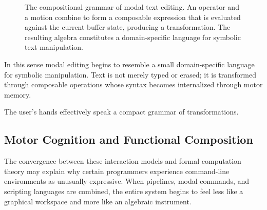 \documentclass[11pt]{article}
\theoremstyle{definition}
\begin{document}
\begin{figure}[h]
\centering
{}
\caption{The compositional grammar of modal text editing. An operator
and a motion combine to form a composable expression that is evaluated
against the current buffer state, producing a transformation. The
resulting algebra constitutes a domain-specific language for symbolic
text manipulation.}
\label{fig:modal_grammar}
\end{figure}

In this sense modal editing begins to resemble a small domain-specific
language for symbolic manipulation. Text is not merely typed or erased;
it is transformed through composable operations whose syntax becomes
internalized through motor memory.

The user's hands effectively speak a compact grammar of transformations.

\subsection{Motor Cognition and Functional Composition}

The convergence between these interaction models and formal computation
theory may explain why certain programmers experience command-line
environments as unusually expressive. When pipelines, modal commands,
and scripting languages are combined, the entire system begins to feel
less like a graphical workspace and more like an algebraic instrument.
\end{document}

